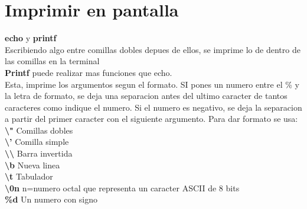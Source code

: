 \documentclass[11pt]{article}
\begin{document}
\section{Imprimir en pantalla}

\textbf{echo} \hspace{2cm} y \hspace{2cm} \textbf{printf}\\
Escribiendo algo entre comillas dobles depues de ellos, se imprime lo de dentro de las comillas en la terminal\\

\textbf{Printf} puede realizar mas funciones que echo.\\
Esta, imprime los argumentos segun el formato. SI pones un numero entre el \% y la letra de formato, se deja una separacion antes del ultimo caracter de tantos caracteres como indique el numero. Si el numero es negativo, se deja la separacion a partir del primer caracter con el siguiente argumento. Para dar formato se usa:\\

\hspace{2cm} \textbf{\textbackslash "} \hspace{2cm} Comillas dobles \\

\hspace{2cm} \textbf{\textbackslash '} \hspace{2cm} Comilla simple\\

\hspace{2cm}\textbf{\textbackslash \textbackslash} \hspace{2cm} Barra invertida\\

\hspace{2cm}\textbf{\textbackslash b} \hspace{2cm} Nueva linea\\

\hspace{2cm}\textbf{\textbackslash t}\hspace{2cm} Tabulador\\

\hspace{2cm}\textbf{\textbackslash 0n}\hspace{2cm} n=numero octal que representa un caracter ASCII de 8 bits\\

\hspace{2cm}\textbf{\%d} \hspace{2cm} Un numero con signo\\
\end{document}
